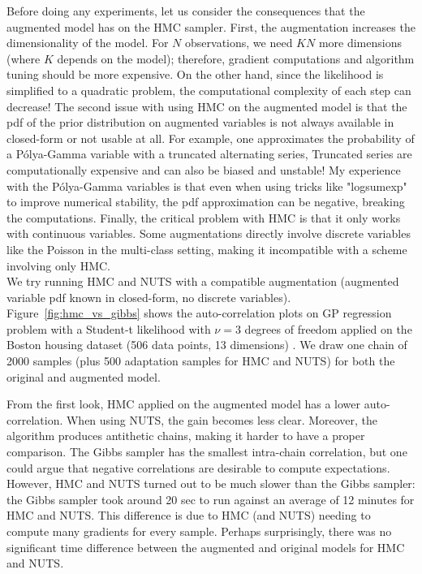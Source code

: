 Before doing any experiments, let us consider the consequences that the augmented model has on the \ac{HMC} sampler.
First, the augmentation increases the dimensionality of the model.
For $N$ observations, we need $KN$ more dimensions (where $K$ depends on the model); therefore, gradient computations and algorithm tuning should be more expensive.
On the other hand, since the likelihood is simplified to a quadratic problem, the computational complexity of each step can decrease!
The second issue with using \ac{HMC} on the augmented model is that the \ac{pdf} of the prior distribution on augmented variables is not always available in closed-form or not usable at all.
For example, one approximates the probability of a P\'olya-Gamma variable with a truncated alternating series,
Truncated series are computationally expensive and can also be biased and unstable!
My experience with the P\'olya-Gamma variables is that even when using tricks like "logsumexp" to improve numerical stability, the \ac{pdf} approximation can be negative, breaking the computations.
Finally, the critical problem with \ac{HMC} is that it only works with continuous variables.
Some augmentations directly involve discrete variables like the Poisson in the multi-class setting, making it incompatible with a scheme involving only \ac{HMC}.\\

We try running \ac{HMC} and \ac{NUTS} with a compatible augmentation (augmented variable \ac{pdf} known in closed-form, no discrete variables).
Figure~\ref{fig:hmc_vs_gibbs} shows the auto-correlation plots on \ac{GP} regression problem with a Student-t likelihood with $\nu=3$ degrees of freedom applied on the Boston housing dataset (506 data points, 13 dimensions) \cite{harrison1978hedonic}.
We draw one chain of 2000 samples (plus 500 adaptation samples for \ac{HMC} and \ac{NUTS}) for both the original and augmented model.

From the first look, \ac{HMC} applied on the augmented model has a lower auto-correlation.
When using \ac{NUTS}, the gain becomes less clear.
Moreover, the algorithm produces antithetic chains, making it harder to have a proper comparison.
The Gibbs sampler has the smallest intra-chain correlation, but one could argue that negative correlations are desirable to compute expectations.
However, \ac{HMC} and \ac{NUTS} turned out to be much slower than the Gibbs sampler:
the Gibbs sampler took around 20 sec to run against an average of 12 minutes for \ac{HMC} and \ac{NUTS}.
This difference is due to \ac{HMC} (and \ac{NUTS}) needing to compute many gradients for every sample.  
Perhaps surprisingly, there was no significant time difference between the augmented and original models for \ac{HMC} and \ac{NUTS}.

